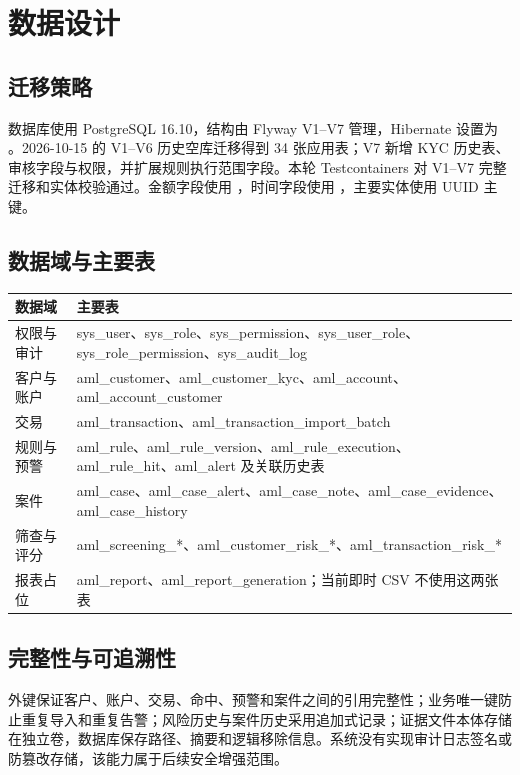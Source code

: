 \documentclass[UTF8,openany,zihao=-4]{ctexrep}
\begin{document}
\chapter{数据设计}
\section{迁移策略}
数据库使用 PostgreSQL 16.10，结构由 Flyway V1--V7 管理，Hibernate 设置为 。2026-10-15 的 V1--V6 历史空库迁移得到 34 张应用表；V7 新增 KYC 历史表、审核字段与权限，并扩展规则执行范围字段。本轮 Testcontainers 对 V1--V7 完整迁移和实体校验通过。金额字段使用 ，时间字段使用 ，主要实体使用 UUID 主键。

\Needspace{0.62\textheight}
\section{数据域与主要表}
\begin{longtable}{p{}p{}}
\toprule 数据域 & 主要表 \\ \midrule
权限与审计 & sys\_user、sys\_role、sys\_permission、sys\_user\_role、sys\_role\_permission、sys\_audit\_log \\
客户与账户 & aml\_customer、aml\_customer\_kyc、aml\_account、aml\_account\_customer \\
交易 & aml\_transaction、aml\_transaction\_import\_batch \\
规则与预警 & aml\_rule、aml\_rule\_version、aml\_rule\_execution、aml\_rule\_hit、aml\_alert 及关联历史表 \\
案件 & aml\_case、aml\_case\_alert、aml\_case\_note、aml\_case\_evidence、aml\_case\_history \\
筛查与评分 & aml\_screening\_*、aml\_customer\_risk\_*、aml\_transaction\_risk\_* \\
报表占位 & aml\_report、aml\_report\_generation；当前即时 CSV 不使用这两张表 \\
\bottomrule
\end{longtable}

\section{完整性与可追溯性}
外键保证客户、账户、交易、命中、预警和案件之间的引用完整性；业务唯一键防止重复导入和重复告警；风险历史与案件历史采用追加式记录；证据文件本体存储在独立卷，数据库保存路径、摘要和逻辑移除信息。系统没有实现审计日志签名或防篡改存储，该能力属于后续安全增强范围。
\end{document}
